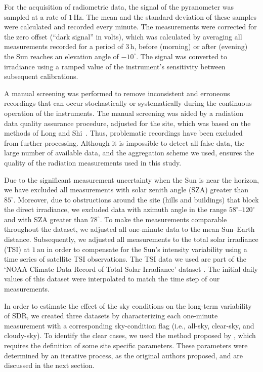 \documentclass[applsci,article,accept,moreauthors,pdftex]{Definitions/mdpi}
\begin{document}
For the acquisition of radiometric data, the signal of the pyranometer
was sampled at a rate of \(1\,\text{Hz}\). The mean and the standard
deviation of these samples were calculated and recorded every minute. The
measurements were corrected for the zero offset (``dark signal'' in
volts), which was calculated by averaging all measurements recorded for a
period of \(3\,\text{h}\), before (morning) or after (evening) the Sun
reaches an elevation angle of \(-10^\circ\). The signal was converted to
irradiance using a ramped value of the instrument's sensitivity between
subsequent calibrations.

A manual screening was performed to remove inconsistent and erroneous
recordings that can occur stochastically or systematically during the
continuous operation of the instruments. The manual screening was aided
by a radiation data quality assurance procedure, adjusted for the site,
which was based on the methods of Long and
Shi~\citep{Long2006, Long2008a}. Thus, problematic recordings have been
excluded from further processing. Although it is impossible to detect
all false data, the large number of available data, and the aggregation
scheme we used, ensures the quality of the radiation measurements used
in this study.

Due to the significant measurement uncertainty when the Sun is near the
horizon, we have excluded all measurements with solar zenith angle (SZA)
greater than \(85^\circ\). Moreover, due to obstructions around the site
(hills and buildings) that block the direct irradiance, we excluded
data with azimuth angle in the range \(58^{\circ}\)--\(120^{\circ}\)
and with SZA greater than \(78^{\circ}\). To make the measurements
comparable throughout the dataset, we adjusted all one-minute data to
the mean Sun--Earth distance. Subsequently, we adjusted all
measurements to the total solar irradiance (TSI) at \(1\,\text{au}\) in
order to compensate for the Sun's intensity variability using a time
series of satellite TSI observations. The TSI data we used are part of
the `NOAA Climate Data Record of Total Solar Irradiance' dataset
\citep{Coddington2005}. The initial daily values of this dataset were
interpolated to match the time step of our measurements.

In order to estimate the effect of the sky conditions on the long-term
variability of SDR, we created three datasets by characterizing each
one-minute measurement with a corresponding sky-condition flag (i.e.,
all-sky, clear-sky, and cloudy-sky). To identify the clear cases, we used
the method proposed by \citet{Reno2016}, which requires the definition
of some site specific parameters. These parameters were determined by an
iterative process, as the original authors proposed, and are discussed in
the next section.
\end{document}
